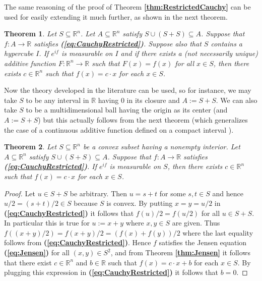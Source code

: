 \documentclass[12 pt]{amsart}
\newtheorem{thm}{Theorem}[section]
\theoremstyle{definition}
\newcommand{\R}{\mathbb{R}}
\newcommand{\bref}[1]{\textbf{\ref{#1}}} %
\newcommand{\beqref}[1]{\textbf{(\ref{#1})}} %
\begin{document}
The same reasoning of the proof of Theorem \bref{thm:RestrictedCauchy} 
can be used for easily extending it much further, as shown in the next 
theorem. 
\begin{thm}
Let $S\subseteq \R^n$. Let $A\subseteq \R^n$ satisfy $S\cup(S+S)\subseteq A$. 
Suppose that $f:A\to\R$ satisfies \beqref{eq:CauchyRestricted}. 
Suppose also that $S$ contains a hypercube $I$. If $e^{if}$ is measurable on $I$ and 
if there exists a (not necessarily unique) additive function $F:\R^n\to\R$ 
such that $F(x)=f(x)$ for all $x\in S$, then  there exists $c\in\R^n$ such that 
$f(x)=c\cdot x$ for each $x\in S$. 
\end{thm}
Now the theory developed in the literature can be used, so for instance, 
we may take $S$ to be  any interval in $\R$ having 0 in 
its closure \cite[Theorem 13.5.2, p. 368]{Kuczma2009book} and $A:=S+S$. We can also take $S$ to be a multidimensional ball having the origin as its center \cite[Corollary 13.6.3, p.  373]{Kuczma2009book} 
(and $A:=S+S$) but this actually follows from the next theorem (which generalizes 
the case of a continuous additive function defined on a compact interval \cite[pp. 45--46]{Aczel}). 
\begin{thm}\label{thm:RestrictedConvex}
Let $S\subseteq \R^n$ be a convex subset having a nonempty interior. 
Let $A\subseteq \R^n$ satisfy $S\cup(S+S)\subseteq A$. 
Suppose that $f:A\to\R$ satisfies \beqref{eq:CauchyRestricted}. 
 If $e^{if}$ is measurable on $S$, 
 then  there exists $c\in\R^n$ such that $f(x)=c\cdot x$ for each $x\in S$.
\end{thm}
\begin{proof}
Let $u\in S+S$ be arbitrary. Then $u=s+t$ for some $s,t\in S$ 
and hence $u/2=(s+t)/2\in S$ because $S$ is convex. By putting $x=y=u/2$ 
in \beqref{eq:CauchyRestricted} it follows that $f(u)/2=f(u/2)$ for 
all $u\in S+S$. In particular this is true for $u:=x+y$ where $x,y\in S$ are given. 
Thus $f((x+y)/2)=f(x+y)/2=(f(x)+f(y))/2$ where the last equality follows from \beqref{eq:CauchyRestricted}. 
Hence $f$ satisfies the Jensen equation \beqref{eq:Jensen} for all $(x,y)\in S^2$, 
and from Theorem \bref{thm:Jensen} it follows that there exist $c\in \R^n$ 
and $b\in\R$ such that $f(x)=c\cdot x+b$ 
for each $x\in S$. By plugging this expression in \beqref{eq:CauchyRestricted} 
it follows that $b=0$. 
\end{proof}
\end{document}
